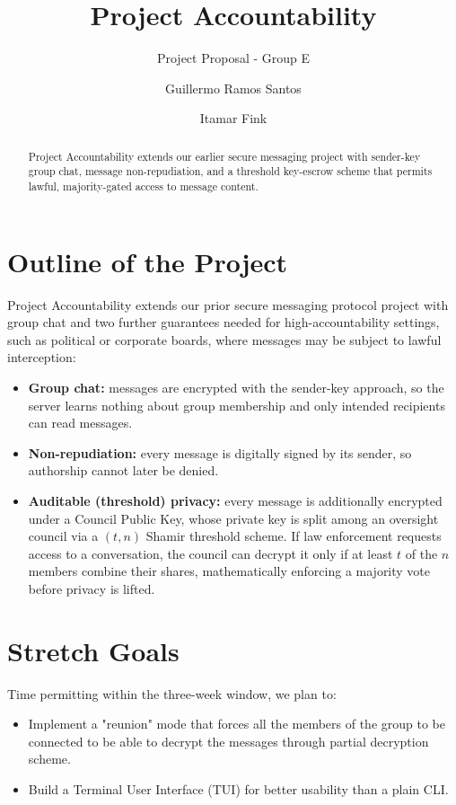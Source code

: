 \documentclass[sigconf]{acmart}
\begin{document}
\title{Project Accountability}
\subtitle{Project Proposal - Group E}

\author{Guillermo Ramos Santos}

\author{Itamar Fink}

\begin{abstract}
	Project Accountability extends our earlier secure messaging project with sender-key group chat, message non-repudiation, and a threshold key-escrow scheme that permits lawful, majority-gated access to message content.
\end{abstract}

\maketitle

\section{Outline of the Project}
Project Accountability extends our prior secure messaging protocol project
with group chat and two further guarantees needed for high-accountability settings,
such as political or corporate boards, where messages may be subject to lawful interception:

\begin{itemize}
	\item \textbf{Group chat:} messages are encrypted with the sender-key approach, so the server learns nothing about group membership and only intended recipients can read messages.
	\item \textbf{Non-repudiation:} every message is digitally signed by its sender,
	      so authorship cannot later be denied.
	\item \textbf{Auditable (threshold) privacy:} every message is additionally encrypted under a Council Public Key, whose private key is split among an oversight council via a $(t,n)$ Shamir threshold scheme. If law enforcement requests access to a conversation, the council can decrypt it only if at least $t$ of the $n$ members combine their shares, mathematically enforcing a majority vote before privacy is lifted.
\end{itemize}

\section{Stretch Goals}
Time permitting within the three-week window, we plan to:
\begin{itemize}
	\item Implement a "reunion" mode that forces all the members of the group to be
	      connected to be able to decrypt the messages through partial decryption scheme.
	\item Build a Terminal User Interface (TUI) for better usability than a plain CLI.
\end{itemize}
\end{document}
